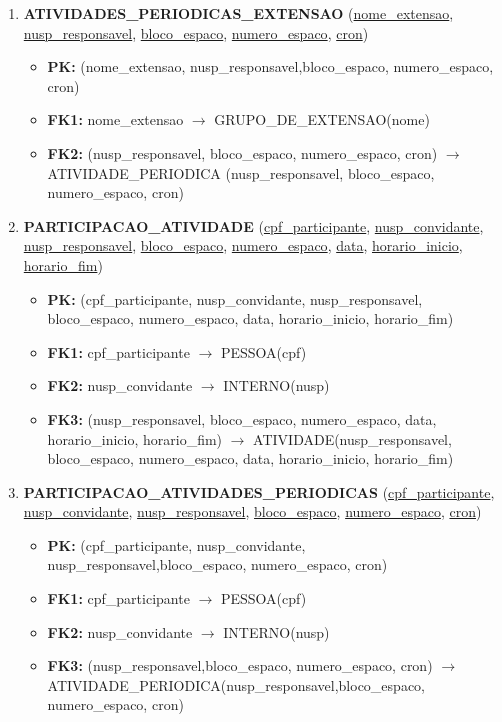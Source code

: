 \documentclass{article}
\begin{document}
\begin{enumerate}
    \item \textbf{ATIVIDADES\_PERIODICAS\_EXTENSAO} (\underline{nome\_extensao}, \underline{nusp\_responsavel}, \underline{bloco\_espaco}, \underline{numero\_espaco}, \underline{cron})
        \begin{itemize}
            \item \textbf{PK:} (nome\_extensao, nusp\_responsavel,bloco\_espaco, numero\_espaco, cron)
            \item \textbf{FK1:} nome\_extensao $\rightarrow$ GRUPO\_DE\_EXTENSAO(nome)
            \item \textbf{FK2:} (nusp\_responsavel, bloco\_espaco, numero\_espaco, cron) $\rightarrow$ ATIVIDADE\_PERIODICA (nusp\_responsavel, bloco\_espaco, numero\_espaco, cron)
        \end{itemize}

    \item \textbf{PARTICIPACAO\_ATIVIDADE} (\underline{cpf\_participante}, \underline{nusp\_convidante}, \underline{nusp\_responsavel}, \underline{bloco\_espaco}, \underline{numero\_espaco}, \underline{data}, \underline{horario\_inicio}, \underline{horario\_fim})
        \begin{itemize}
            \item \textbf{PK:} (cpf\_participante, nusp\_convidante, nusp\_responsavel, bloco\_espaco, numero\_espaco, data, horario\_inicio, horario\_fim)
            \item \textbf{FK1:} cpf\_participante $\rightarrow$ PESSOA(cpf)
            \item \textbf{FK2:} nusp\_convidante $\rightarrow$ INTERNO(nusp)
            \item \textbf{FK3:} (nusp\_responsavel, bloco\_espaco, numero\_espaco, data, horario\_inicio, horario\_fim) $\rightarrow$ ATIVIDADE(nusp\_responsavel, bloco\_espaco, numero\_espaco, data, horario\_inicio, horario\_fim)
        \end{itemize}

    \item \textbf{PARTICIPACAO\_ATIVIDADES\_PERIODICAS} (\underline{cpf\_participante}, \underline{nusp\_convidante}, \underline{nusp\_responsavel}, \underline{bloco\_espaco}, \underline{numero\_espaco}, \underline{cron})
        \begin{itemize}
            \item \textbf{PK:} (cpf\_participante, nusp\_convidante, nusp\_responsavel,bloco\_espaco, numero\_espaco, cron)
            \item \textbf{FK1:} cpf\_participante $\rightarrow$ PESSOA(cpf)
            \item \textbf{FK2:} nusp\_convidante $\rightarrow$ INTERNO(nusp)
            \item \textbf{FK3:} (nusp\_responsavel,bloco\_espaco, numero\_espaco, cron) $\rightarrow$ ATIVIDADE\_PERIODICA(nusp\_responsavel,bloco\_espaco, numero\_espaco, cron)
        \end{itemize}


\end{enumerate}
\end{document}
